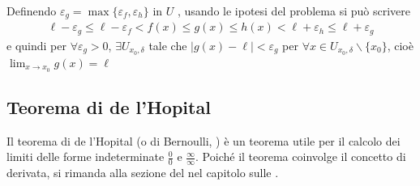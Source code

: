 \documentclass[letterpaper,10pt,italian]{jupyterBook}
\begin{document}
\sphinxAtStartPar
Definendo \(\varepsilon_g = \max\{ \varepsilon_f, \varepsilon_h \}\) in \(U\)  , usando le ipotesi del problema si può scrivere
\begin{equation*}
\begin{split}\ell - \varepsilon_g \le \ell - \varepsilon_f < f(x) \le g(x) \le h(x) < \ell + \varepsilon_h \le \ell + \varepsilon_g\end{split}
\end{equation*}
\sphinxAtStartPar
e quindi per  \(\forall \varepsilon_g > 0\), \(\exists U_{x_0,\delta}\) tale che \(|g(x) - \ell|<\varepsilon_g\) per \(\forall x \in U_{x_0,\delta} \backslash \{ x_0 \}\), cioè \(\lim_{x \rightarrow x_0} g(x) = \ell\)

\sphinxAtStartPar
{} 


\subsection{Teorema di de l’Hopital}
\label{\detokenize{ch/infinitesimal_calculus/analysis:teorema-di-de-l-hopital}}\label{\detokenize{ch/infinitesimal_calculus/analysis:infinitesimal-calculus-limits-thms-hopital}}
\sphinxAtStartPar
Il teorema di de l’Hopital (o di Bernoulli,  ) è un teorema utile per il calcolo dei limiti delle forme indeterminate \(\frac{0}{0}\) e \(\frac{\infty}{\infty}\). Poiché il teorema coinvolge il concetto di derivata, si rimanda alla sezione del {\hyperref[\detokenize{ch/infinitesimal_calculus/derivatives:infinitesimal-calculus-derivatives-thm-hopital}]{}} nel capitolo sulle {\hyperref[\detokenize{ch/infinitesimal_calculus/derivatives:infinitesimal-calculus-derivatives}]{}}.
\end{document}
